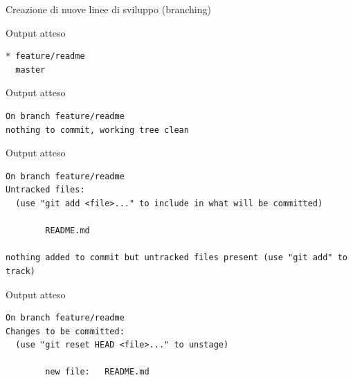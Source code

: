 \documentclass[xcolor=dvipsnames,presentation]{beamer}
\begin{document}
\begin{frame}{Creazione di nuove linee di sviluppo (branching)}
    \begin{block}{Output atteso}
        \begin{Verbatim}[fontsize=\scriptsize]
* feature/readme
  master
        \end{Verbatim}
    \end{block}
    \begin{block}{Output atteso}
        \begin{Verbatim}[fontsize=\scriptsize]
On branch feature/readme
nothing to commit, working tree clean
        \end{Verbatim}
    \end{block}
    \begin{block}{Output atteso}
        \begin{Verbatim}[fontsize=\scriptsize]
On branch feature/readme
Untracked files:
  (use "git add <file>..." to include in what will be committed)

        README.md

nothing added to commit but untracked files present (use "git add" to track)
        \end{Verbatim}
    \end{block}
    \begin{block}{Output atteso}
        \begin{Verbatim}[fontsize=\scriptsize]
On branch feature/readme
Changes to be committed:
  (use "git reset HEAD <file>..." to unstage)

        new file:   README.md


\end{Verbatim}
\end{block}
\end{frame}
\end{document}
